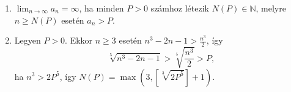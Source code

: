 \documentclass[11pt]{scrartcl}
\begin{document}
\begin{enumerate}
	\item $\lim_{n \to \infty} a_n = \infty$, ha minden $P > 0$ számhoz
	      létezik $N(P) \in \mathbb{N}$, melyre $n \ge N(P)$ esetén $a_n > P$.

	\item Legyen $P > 0$. Ekkor $n \ge 3$ esetén
	      $n^3 - 2n - 1 > \frac{n^3}{2}$, így
	      \[
		      \sqrt[5]{n^3 - 2n - 1} > \sqrt[5]{\frac{n^3}{2}} > P,
	      \]
	      ha $n^3 > 2P^5$, így
	      \(
	      N(P) = \max\left(3, \left[\sqrt[3]{2P^5}\right] + 1\right)
	      \).
\end{enumerate}
\end{document}
